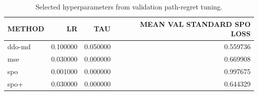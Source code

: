 \begin{table}
\caption{Selected hyperparameters from validation path-regret tuning.}
\label{tab:selected-hparams}
\begin{tabular}{lrrr}
\toprule
METHOD & LR & TAU & MEAN VAL STANDARD SPO LOSS \\
\midrule
ddo-md & 0.100000 & 0.050000 & 0.559736 \\
mse & 0.030000 & 0.000000 & 0.669908 \\
spo & 0.001000 & 0.000000 & 0.997675 \\
spo+ & 0.030000 & 0.000000 & 0.644329 \\
\bottomrule
\end{tabular}
\end{table}
